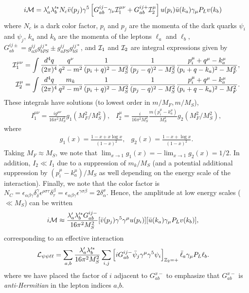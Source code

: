 \begin{align}
    i{\cal M} &= \lambda_a'\lambda_b'^* N_c \bar{v}(p_j)\gamma^5 \left[G^{ij-}_{ab} \gamma_\nu {\cal I}_1^{\mu\nu} + G^{ij+}_{ab}{\cal I}_2^{\mu} \right]u(p_i)\bar{u}(k_a)\gamma_\mu P_L v(k_b)
\end{align}
where $N_c$ is a dark color factor, $p_i$ and $p_j$ are the momenta of the dark quarks $\psi_i$ and $\psi_j$, $k_a$ and $k_b$ are the momenta of the leptons $\ell_a$ and $\ell_b$, $G_{ab}^{ij\pm} = g_{aS}^{ij}g_{bPS}^{ij*} \pm g_{aPS}^{ij}g_{bS}^{ij*}$, and ${\cal I}_1$ and ${\cal I}_2$ are integral expressions given by
\begin{align}
    {\cal I}_1^{\mu\nu} &= \int{\frac{d^4q}{(2\pi)^4}\frac{q^\nu}{q^2 - m^2}}\frac{1}{(p_i+q)^2 - M_S^2}\frac{1}{(p_j - q)^2 - M_S^2}\frac{p_i^\mu+q^\mu - k_a^\mu}{(p_i+q-k_a)^2 - M_F^2},\\
    {\cal I}_2^\mu &= \int{\frac{d^4q}{(2\pi)^4}\frac{m_k}{q^2 - m^2}}\frac{1}{(p_i+q)^2 - M_S^2}\frac{1}{(p_j - q)^2 - M_S^2}\frac{p_i^\mu+q^\mu - k_a^\mu}{(p_i+q-k_a)^2 - M_F^2}.
\end{align}
These integrals have solutions (to lowest order in $m/M_F, m/M_S$), 
\begin{align}
    & I_{1}^{\mu\nu} = \frac{ig^{\mu\nu}}{16\pi^2 M_S^2}g_1(M_F^2/M_S^2),
    & I_{2}^{\mu} = \frac{i}{16\pi^2 M_S^2}\frac{m(p_i^\mu - k_a^\mu)}{M_S^2}g_2(M_F^2/M_S^2), &
\end{align}
where
\begin{align}
    & g_1(x) = \frac{1-x+x\log{x}}{(1-x)^2},
     & g_2(x) = \frac{1-x+\log{x}}{(1-x)^2}. &
\end{align}
Taking $M_F \approx M_S$, we note that $\lim_{x\rightarrow 1}g_1(x) = -\lim_{x\rightarrow 1}g_2(x) = 1/2$. In addition, $I_2 \ll I_1$ due to a suppression of $m_k/M_S$ (and a potential additional suppression by $(p_i^\mu - k_a^\mu)/M_S$ as well depending on the energy scale of the interaction). Finally, we note that the color factor is $N_C = \epsilon_{\alpha\beta\gamma}\delta_{\delta}^{\gamma}\epsilon^{\rho\sigma\tau}\delta_{\tau}^{\beta}=\epsilon_{\alpha\beta\gamma}\epsilon^{\gamma\sigma\beta} = 2\delta_\alpha^\sigma$. Hence, the amplitude at low energy scales ($\ll M_S$) can be written
\begin{align}
    i{\cal M} &\approx \frac{\lambda_a'\lambda_b'^* G_{ab}^{ij-}}{16\pi^2 M_S^2}[\bar{v}(p_j)\gamma^5 \gamma^\mu u(p_i)][ \bar{u}(k_a) \gamma_\mu P_L v(k_b)],
\end{align}
corresponding to an effective interaction 
\begin{align}
    {\cal L}_{\psi\psi\ell\ell} &= \sum_{a,b}\frac{\lambda_a'\lambda_b'^*}{16\pi^2 M_S^2} \sum_{i,j}\left[iG_{ab}^{ij-}\bar{\psi}_j \gamma^\mu \gamma^5 \psi_i\right]_{{\Bbb Z}_2 = +} \bar{\ell}_a \gamma_\mu P_L \ell_b. \label{eq:dark_quark_eff_int}
\end{align}
where we have placed the factor of $i$ adjacent to $G_{ab}^{x-}$ to emphasize that $G_{ab}^{x-}$ is {\it anti-Hermitian} in the lepton indices $a$,$b$.
